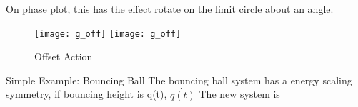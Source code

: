 On phase plot, this has the effect rotate on the limit circle about an angle.


\begin{figure}[!htbp]
  \begin{center}
    \leavevmode
    \ifpdf
      \texttt{[image: g\_off]}
    \else
      \texttt{[image: g\_off]}
    \fi
    \caption{Offset Action}
    \label{fig:goff}
\end{center}
\end{figure}





Simple Example:
Bouncing Ball
The bouncing ball system has a energy scaling symmetry, if bouncing height is q(t), $\dot{q(t)}$
The new system is 
